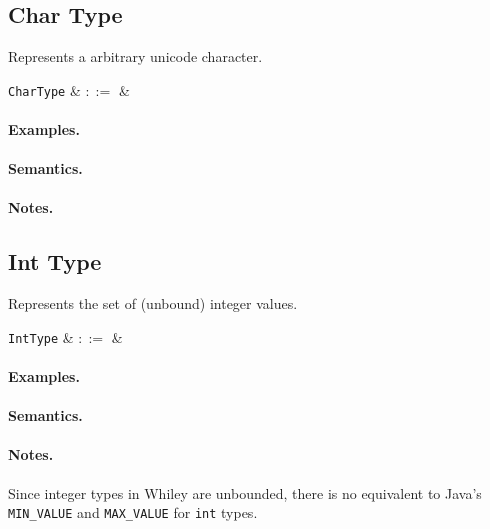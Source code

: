 \subsection{Char Type}

Represents a arbitrary unicode character.

\begin{syntax}
  \verb+CharType+ & $::=$ &  \\
\end{syntax}

\paragraph{Examples.}

\paragraph{Semantics.}

\paragraph{Notes.} 


\subsection{Int Type}

Represents the set of (unbound) integer values. 

\begin{syntax}
  \verb+IntType+ & $::=$ &  \\
\end{syntax}

\paragraph{Examples.}

\paragraph{Semantics.}

\paragraph{Notes.}  Since integer types in Whiley are unbounded, there
is no equivalent to Java's \lstinline{MIN_VALUE} and \lstinline{MAX_VALUE} for \lstinline{int} types.

